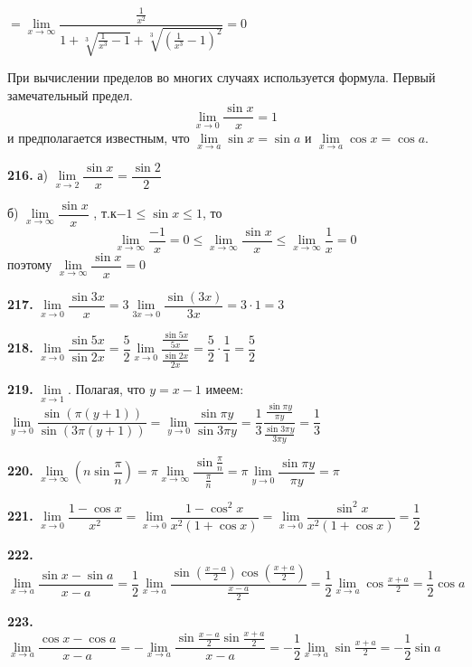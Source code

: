 \documentclass[12pt]{article}
\begin{document}
	$
	=\lim\limits_{x\to\infty} \dfrac{\frac{1}{x^2}}{1+\sqrt[3]{\frac{1}{x^3}-1}+\sqrt[3]{(\frac{1}{x^3}-1)^2}} = 0
	$
	
	\medskip
	
	При вычислении пределов во многих случаях используется формула. Первый замечательный предел.
	\[
		\lim\limits_{x\to 0} \dfrac{\sin x}{x} = 1
	\]
	и предполагается известным, что $\lim\limits_{x\to a}\sin x = \sin a$ и $\lim\limits_{x\to a}\cos x = \cos a$.
	
	
	\medskip
	{\bf 216.} а) $\lim\limits_{x\to2} \dfrac{\sin x}{x} = \dfrac{\sin 2}{2}$
	
	\quad б) $\lim\limits_{x\to\infty} \dfrac{\sin x}{x}$ , т.к\quad $-1\le \sin x \le 1$, то 
	\[
		\lim\limits_{x\to\infty}\dfrac{-1}{x}=0 \le \lim\limits_{x\to\infty} \dfrac{\sin x}{x} \le \lim\limits_{x\to\infty} \dfrac{1}{x}=0
	\]
	поэтому $\lim\limits_{x\to\infty} \dfrac{\sin x}{x} = 0$
	
	\medskip
	{\bf 217.} $\lim\limits_{x\to0} \dfrac{\sin 3x}{x} = 3\lim\limits_{3x\to0} \dfrac{\sin (3x)}{3x} = 3\cdot1 = 3$
	
	\medskip
	{\bf 218.} $\lim\limits_{x\to0} \dfrac{\sin 5x}{\sin 2x} = \dfrac{5}{2}\lim\limits_{x\to0} \dfrac{\frac{\sin 5x}{5x}}{\frac{\sin 2x}{2x}} = \dfrac{5}{2}\cdot \dfrac{1}{1} = \dfrac{5}{2}$
	
	\medskip
	{\bf 219.} $\lim\limits_{x\to1}$. Полагая, что $y=x-1$ имеем: $\lim\limits_{y\to0} \dfrac{\sin(\pi(y+1))}{\sin(3\pi(y+1))} = \lim\limits_{y\to0} \dfrac{\sin \pi y}{\sin 3\pi y} = \dfrac{1}{3}\dfrac{\frac{\sin \pi y}{\pi y}}{\frac{\sin 3\pi y}{3\pi y}} = \dfrac{1}{3}$
	
	\medskip
	{\bf 220.} $\lim\limits_{x\to\infty} \left(n\sin\dfrac{\pi}{n}\right) = \pi\lim\limits_{x\to\infty} \dfrac{\sin \frac{\pi}{n}}{\frac{\pi}{n}} = \pi \lim\limits_{y\to 0}\dfrac{\sin \pi y}{\pi y} = \pi$
	
	\medskip
	{\bf 221.} $\lim\limits_{x\to0} \dfrac{1-\cos x}{x^2} = \lim\limits_{x\to0} \dfrac{1-\cos^2 x}{x^2(1+\cos x)} = \lim\limits_{x\to0} \dfrac{\sin^2 x}{x^2(1+\cos x)} = \dfrac{1}{2}$
	
	\medskip
	{\bf 222.} $\lim\limits_{x\to a} \dfrac{\sin x-\sin a}{x-a} = \dfrac{1}{2}\lim\limits_{x\to a} \dfrac{\sin(\frac{x-a}{2})\cos(\frac{x+a}{2})}{\frac{x-a}{2}} = \dfrac{1}{2}\lim\limits_{x\to a} \cos \frac{x+a}{2} = \dfrac{1}{2}\cos a$
	
	\medskip
	{\bf 223.} $\lim\limits_{x\to a} \dfrac{\cos x-\cos a}{x-a} = -\lim\limits_{x\to a} \dfrac{\sin\frac{x-a}{2}\sin\frac{x+a}{2}}{x-a} = -\dfrac{1}{2}\lim\limits_{x\to a} \sin\frac{x+a}{2} = -\dfrac{1}{2}\sin a$
	
\end{document}
